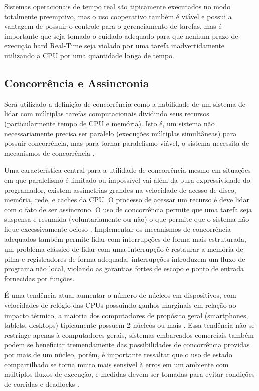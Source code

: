 Sistemas operacionais de tempo real são tipicamente executados no modo totalmente preemptivo, mas o uso cooperativo também é viável e possui a vantagem de possuir o controle para o gerenciamento de tarefas, mas é importante que seja tomado o cuidado adequado para que nenhum prazo de execução hard Real-Time seja violado por uma tarefa inadvertidamente utilizando a CPU por uma quantidade longa de tempo.

\subsection{Concorrência e Assincronia}

Será utilizado a definição de concorrência como a habilidade de um sistema de lidar com múltiplas tarefas computacionais dividindo seus recursos (particularmente tempo de CPU e memória). Isto é, um sistema não necessariamente precisa ser paralelo (execuções múltiplas simultâneas) para possuir concorrência, mas para tornar paralelismo viável, o sistema necessita de mecanismos de concorrência \cite{MakingReliableDistSystems}.

Uma característica central para a utilidade de concorrência mesmo em situações em que paralelismo é limitado ou impossível vai além da pura expressividade do programador, existem assimetrias grandes na velocidade de acesso de disco, memória, rede, e caches da CPU. O processo de acessar um recurso é deve lidar com o fato de ser assíncrono. O uso de concorrência permite que uma tarefa seja suspensa e resumida (voluntariamente ou não) o que permite que o sistema não fique excessivamente ocioso \cite{OperatingSystemConcepts}. Implementar os mecanismos de concorrência adequados também permite lidar com interrupções de forma mais estruturada, um problema clássico de lidar com uma interrupção é restaurar a memória de pilha e registradores de forma adequada, interrupções introduzem um fluxo de programa não local, violando as garantias fortes de escopo e ponto de entrada fornecidas por funções.

É uma tendência atual aumentar o número de núcleos em dispositivos, com velocidades de relógio das CPUs possuindo ganhos marginais em relação ao impacto térmico, a maioria dos computadores de propósito geral (smartphones, tablets, desktops) tipicamente possuem 2 núcleos ou mais \cite{ComputerOrganizationAndDesign}. Essa tendência não se restringe apenas à computadores gerais, sistemas embarcados comerciais também podem se beneficiar tremendamente das possibilidades de concorrência providas por mais de um núcleo, porém, é importante ressaltar que o uso de estado compartilhado se torna muito mais sensível à erros em um ambiente com múltiplos fluxos de execução, e medidas devem ser tomadas para evitar condições de corridas e deadlocks \cite{OperatingSystemConcepts}.


